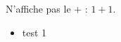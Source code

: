 \documentclass[
	fontsize=10pt, %
	twoside=true, %
]{kaobook}
\begin{document}
\mainmatter %

\setcounter{margintocdepth}{\sectiontocdepth}
\marginlayout

N'affiche pas le + : $1+1$.

\begin{itemize}
\item test 1
\end{itemize}
\end{document}
